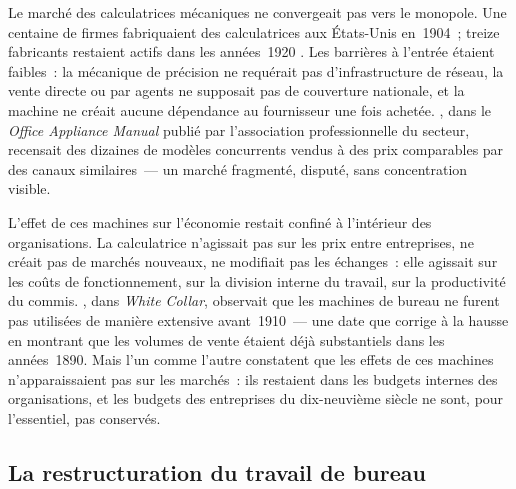 %
Le marché des calculatrices mécaniques ne convergeait pas vers le monopole. Une centaine de firmes fabriquaient des calculatrices aux États-Unis en~1904~; treize fabricants restaient actifs dans les années~1920 \parencite{cortada_before_1993}. Les barrières à l'entrée étaient faibles~: la mécanique de précision ne requérait pas d'infrastructure de réseau, la vente directe ou par agents ne supposait pas de couverture nationale, et la machine ne créait aucune dépendance au fournisseur une fois achetée. \textcite{leffingwell_office_1926}, dans le \emph{Office Appliance Manual} publié par l'association professionnelle du secteur, recensait des dizaines de modèles concurrents vendus à des prix comparables par des canaux similaires~--- un marché fragmenté, disputé, sans concentration visible.

%
L'effet de ces machines sur l'économie restait confiné à l'intérieur des organisations. La calculatrice n'agissait pas sur les prix entre entreprises, ne créait pas de marchés nouveaux, ne modifiait pas les échanges~: elle agissait sur les coûts de fonctionnement, sur la division interne du travail, sur la productivité du commis. \textcite{mills_white_1951}, dans \emph{White Collar}, observait que les machines de bureau ne furent pas utilisées de manière extensive avant~1910~--- une date que \textcite{cortada_before_1993} corrige à la hausse en montrant que les volumes de vente étaient déjà substantiels dans les années~1890. Mais l'un comme l'autre constatent que les effets de ces machines n'apparaissaient pas sur les marchés~: ils restaient dans les budgets internes des organisations, et les budgets des entreprises du dix-neuvième siècle ne sont, pour l'essentiel, pas conservés.


\subsection{La restructuration du travail de bureau}\label{subsec:calcul_travail}

